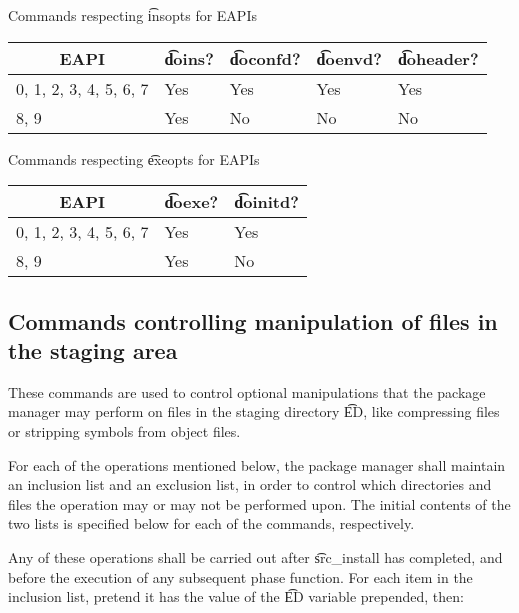 \begin{centertable}{Commands respecting \t{insopts} for EAPIs}
    \label{tab:insopts-commands}
    \begin{tabular}{lllll}
      \toprule
      \multicolumn{1}{c}{\textbf{EAPI}} &
      \multicolumn{1}{c}{\textbf{\t{doins}?}} &
      \multicolumn{1}{c}{\textbf{\t{doconfd}?}} &
      \multicolumn{1}{c}{\textbf{\t{doenvd}?}} &
      \multicolumn{1}{c}{\textbf{\t{doheader}?}} \\
      \midrule
      0, 1, 2, 3, 4, 5, 6, 7  & Yes & Yes & Yes & Yes \\
      8, 9                    & Yes & No  & No  & No  \\
      \bottomrule
    \end{tabular}
\end{centertable}

\begin{centertable}{Commands respecting \t{exeopts} for EAPIs}
    \label{tab:exeopts-commands}
    \begin{tabular}{lll}
      \toprule
      \multicolumn{1}{c}{\textbf{EAPI}} &
      \multicolumn{1}{c}{\textbf{\t{doexe}?}} &
      \multicolumn{1}{c}{\textbf{\t{doinitd}?}} \\
      \midrule
      0, 1, 2, 3, 4, 5, 6, 7  & Yes & Yes \\
      8, 9                    & Yes & No  \\
      \bottomrule
    \end{tabular}
\end{centertable}

\subsection{Commands controlling manipulation of files in the staging area}
These commands are used to control optional manipulations that the package manager may perform on
files in the staging directory \t{ED}, like compressing files or stripping symbols from object
files.

For each of the operations mentioned below, the package manager shall maintain an inclusion list
and an exclusion list, in order to control which directories and files the operation may or may not
be performed upon. The initial contents of the two lists is specified below for each of the
commands, respectively.

Any of these operations shall be carried out after \t{src_install} has completed, and before the
execution of any subsequent phase function. For each item in the inclusion list, pretend it has
the value of the \t{ED} variable prepended, then:

